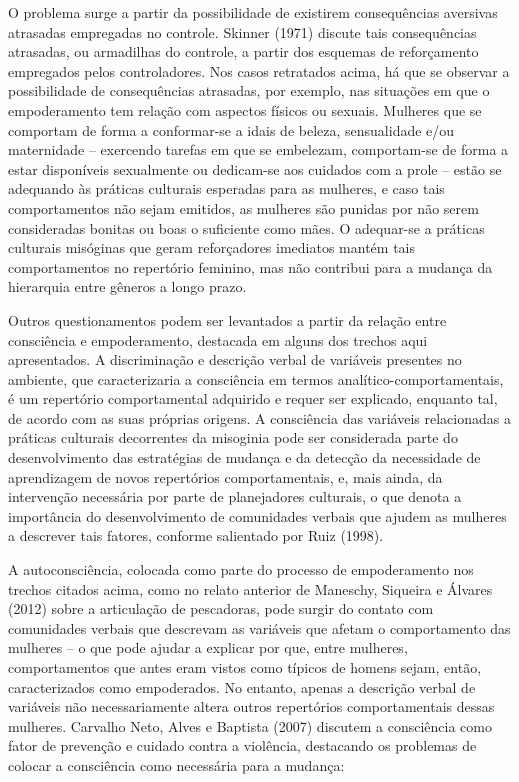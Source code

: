 O problema surge a partir da possibilidade de existirem consequências aversivas atrasadas empregadas no controle. Skinner (1971) discute tais consequências atrasadas, ou armadilhas do controle, a partir dos esquemas de reforçamento empregados pelos controladores. Nos casos retratados acima, há que se observar a possibilidade de consequências atrasadas, por exemplo, nas situações em que o empoderamento tem relação com aspectos físicos ou sexuais. Mulheres que se comportam de forma a conformar-se a idais de beleza, sensualidade e/ou maternidade – exercendo tarefas em que se embelezam, comportam-se de forma a estar disponíveis sexualmente ou dedicam-se aos cuidados com a prole – estão se adequando às práticas culturais esperadas para as mulheres, e caso tais comportamentos não sejam emitidos, as mulheres são punidas por não serem consideradas bonitas ou boas o suficiente como mães. O adequar-se a práticas culturais misóginas que geram reforçadores imediatos mantém tais comportamentos no repertório feminino, mas não contribui para a mudança da hierarquia entre gêneros a longo prazo.

Outros questionamentos podem ser levantados a partir da relação entre consciência e empoderamento, destacada em alguns dos trechos aqui apresentados. A discriminação e descrição verbal de variáveis presentes no ambiente, que caracterizaria a consciência em termos analítico-comportamentais, é um repertório comportamental adquirido e requer ser explicado, enquanto tal, de acordo com as suas próprias origens. A consciência das variáveis relacionadas a práticas culturais decorrentes da misoginia pode ser considerada parte do desenvolvimento das estratégias de mudança e da detecção da necessidade de aprendizagem de novos repertórios comportamentais, e, mais ainda, da intervenção necessária por parte de planejadores culturais, o que denota a importância do desenvolvimento de comunidades verbais que ajudem as mulheres a descrever tais fatores, conforme salientado por Ruiz (1998).

A autoconsciência, colocada como parte do processo de empoderamento nos trechos citados acima, como no relato anterior de Maneschy, Siqueira e Álvares (2012) sobre a articulação de pescadoras, pode surgir do contato com comunidades verbais que descrevam as variáveis que afetam o comportamento das mulheres – o que pode ajudar a explicar por que, entre mulheres, comportamentos que antes eram vistos como típicos de homens sejam, então, caracterizados como empoderados. No entanto, apenas a descrição verbal de variáveis não necessariamente altera outros repertórios comportamentais dessas mulheres. Carvalho Neto, Alves e Baptista (2007) discutem a consciência como fator de prevenção e cuidado contra a violência, destacando os problemas de colocar a consciência como necessária para a mudança:

